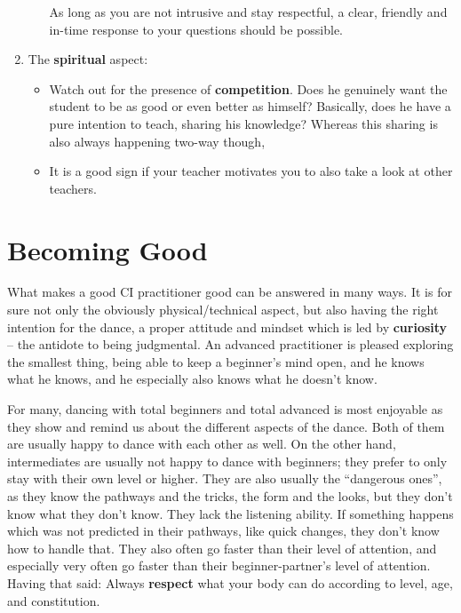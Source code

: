 \begin{enumerate}
\begin{itemize}
        As long as you are not intrusive and stay respectful, a clear, friendly and in-time response to your questions should be possible.
    \end{itemize}
    \item The \textbf{spiritual} aspect:
    \begin{itemize}
        \item Watch out for the presence of \textbf{competition}.
        Does he genuinely want the student to be as good or even better as himself?
        Basically, does he have a pure intention to teach, sharing his knowledge? Whereas this sharing is also always happening two-way though,
        \item It is a good sign if your teacher motivates you to also take a look at other teachers.
    \end{itemize}
\end{enumerate}

\section{Becoming Good}\label{sec:becoming-good}

What makes a good CI practitioner good can be answered in many ways.
It is for sure not only the obviously physical/technical aspect, but also having the right intention for the dance, a proper attitude and mindset which is led by \textbf{curiosity} -- the antidote to being judgmental.
An advanced practitioner is pleased exploring the smallest thing, being able to keep a beginner's mind open, and he knows what he knows, and he especially also knows what he doesn't know.

For many, dancing with total beginners and total advanced is most enjoyable as they show and remind us about the different aspects of the dance.
Both of them are usually happy to dance with each other as well.
On the other hand, intermediates are usually not happy to dance with beginners; they prefer to only stay with their own level or higher.
They are also usually the ``dangerous ones'', as they know the pathways and the tricks, the form and the looks, but they don't know what they don't know.
They lack the listening ability.
If something happens which was not predicted in their pathways, like quick changes, they don't know how to handle that.
They also often go faster than their level of attention, and especially very often go faster than their beginner-partner's level of attention.
Having that said: Always \textbf{respect} what your body can do according to level, age, and constitution.

